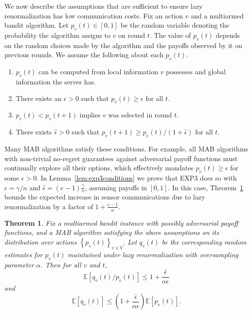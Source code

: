 \documentclass{sig-alternate-dan}
\numberwithin{equation}{section}
\newcommand{\algofont}[1]{\textsc{#1}}
\newcommand{\EXPthree}{{\algofont{EXP3}}\xspace}
\newcommand{\numsensors}{\ensuremath{n}}
\newcommand{\sensor}{\ensuremath{v}}
\newcommand{\sensors}{V}
\newcommand{\paren} [1] {\ensuremath{ \left( {#1} \right) }}
\newcommand{\set}[1]{\ensuremath{\left\{#1\right\}}}
\newcommand{\E}[1]{\ensuremath{\mathbb{E}\left[#1\right] }}
\newtheorem{theorem}{Theorem}
\begin{document}
{%
We now describe the assumptions that are sufficient to ensure lazy
renormalization has low communication costs.
Fix an action $\sensor$ and a multiarmed bandit algorithm.
Let $p_{\sensor}(t) \in [0,1]$ be the random variable denoting the
probability the algorithm assigns to $\sensor$ on round $t$.
The value of $p_{\sensor}(t)$ depends on the random choices made by
the algorithm and the payoffs observed by it on previous rounds.
We assume the following about each $p_{\sensor}(t)$.
\begin{enumerate}
\item $p_{\sensor}(t)$ can be computed from local information
  $\sensor$ possesses and global information the server has.
\item There exists an $\epsilon > 0$ such that $p_{\sensor}(t)
  \ge \epsilon$ for all $t$.
\item $p_{\sensor}(t) < p_{\sensor}(t+1)$ implies $\sensor$ was
  selected in round $t$.
\item There exists $\hat{\epsilon} > 0$ such that 
  $p_{\sensor}(t+1) \ge p_{\sensor}(t)/(1+\hat{\epsilon})$ for all $t$.
\end{enumerate}
Many MAB algorithms satisfy these conditions.
For example, all MAB algorithms with non-trivial no-regret guarantees
against adversarial payoff functions must continually explore all
their options, which effectively mandates $p_{\sensor}(t) \ge
\epsilon$ for some $\epsilon > 0$.  In Lemma~\ref{lem:exp3conditions}
we prove that \EXPthree does so with $\epsilon = \gamma/\numsensors$ and
$\hat{\epsilon} = (e-1)\frac{\gamma}{\numsensors}$, assuming payoffs in $[0,1]$.
In this case, Theorem~\ref{thm:lazy_renorm_ratio} bounds the expected
increase in sensor communications due to lazy renormalization by a
factor of $1  + \frac{e-1}{\alpha}$.
%
%
%

\begin{theorem} \label{thm:lazy_renorm_ratio}
Fix a multiarmed bandit instance with possibly adversarial payoff
functions, and a MAB algorithm 
%
satisfying the above assumptions on its distribution over actions
$\set{p_{\sensor}(t)}_{\sensor \in \sensors}$.
Let $q_{\sensor}(t)$ be the corresponding random estimates for
$p_{\sensor}(t)$ maintained under lazy renormalization with
oversampling parameter $\alpha$.
Then for all $\sensor$ and $t$, 
\[
\E{q_{\sensor}(t)/p_{\sensor}(t)} \le 1 + \frac{\hat{\epsilon}}{\alpha\epsilon}
\]
and 
\[
\E{q_{\sensor}(t)} \le \paren{1 +
  \frac{\hat{\epsilon}}{\alpha\epsilon}} \E{p_{\sensor}(t)}
\mbox{.}
\]
\end{theorem}


}
\end{document}
